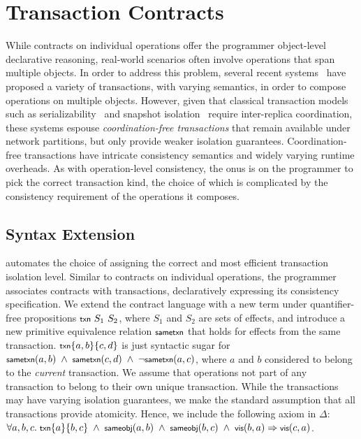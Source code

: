 \section{Transaction Contracts}

While contracts on individual operations offer the programmer object-level
declarative reasoning, real-world scenarios often involve operations that span
multiple objects. In order to address this problem, several recent
systems~\cite{COPS,BurckhardtESOP,BailisHAT} have proposed a variety of
transactions, with varying semantics, in order to compose operations on
multiple objects. However, given that classical transaction models such as
serializability~\cite{} and snapshot isolation~\cite{} require inter-replica
coordination, these systems espouse \emph{coordination-free transactions} that
remain available under network partitions, but only provide weaker isolation
guarantees. Coordination-free transactions have intricate consistency semantics
and widely varying runtime overheads. As with operation-level consistency, the
onus is on the programmer to pick the correct transaction kind, the choice of
which is complicated by the consistency requirement of the operations it
composes.

\subsection{Syntax Extension}

\name automates the choice of assigning the correct and most efficient
transaction isolation level. Similar to contracts on individual operations, the
programmer associates contracts with transactions, declaratively expressing its
consistency specification. We extend the contract language with a new term
under quantifier-free propositions ${\small \txnZ}~S_1~S_2$, where $S_1$ and
$S_2$ are sets of effects, and introduce a new primitive equivalence relation
$\small \sametxnZ$ that holds for effects from the same transaction. $\small
\txn{a,b}{c,d}$ is just syntactic sugar for $\small \sametxn{a}{b} ~\wedge~
\sametxn{c}{d} ~\wedge~ \neg\sametxn{a}{c}$, where $a$ and $b$ considered to
belong to the \emph{current} transaction. We assume that operations not part of
any transaction to belong to their own unique transaction. While the
transactions may have varying isolation guarantees, we make the standard
assumption that all transactions provide atomicity. Hence, we include the
following axiom in $\Delta$: $\small \forall a,b,c.~\txn{a}{b,c} ~\wedge~
\sameobj{a}{b} ~\wedge~ \sameobj{b}{c} ~\wedge~ \vis{b}{a} \Rightarrow
\vis{c}{a}$.

